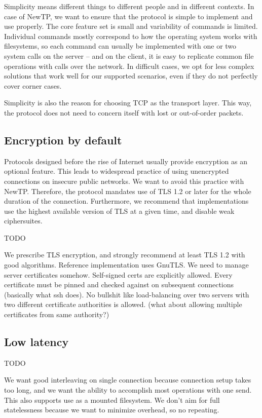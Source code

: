 Simplicity means different things to different people and in different contexts. In case of NewTP, we want to
ensure that the protocol is simple to implement and use properly. The core feature set is small and
variability of commands is limited. Individual commands mostly correspond to how the operating system works
with filesystems, so each command can usually be implemented with one or two system calls on the server -- and
on the client, it is easy to replicate common file operations with calls over the network. In difficult cases,
we opt for less complex solutions that work well for our supported scenarios, even if they do not perfectly
cover corner cases.

Simplicity is also the reason for choosing TCP as the transport layer. This way, the protocol does not need to
concern itself with lost or out-of-order packets.

\subsection{Encryption by default}

Protocols designed before the rise of Internet usually provide encryption as an optional feature. This leads
to widespread practice of using unencrypted connections on insecure public networks. We want to avoid this
practice with NewTP. Therefore, the protocol mandates use of TLS 1.2 or later for the whole duration of the
connection.  Furthermore, we recommend that implementations use the highest available version of TLS at
a given time, and disable weak ciphersuites.

TODO

We prescribe TLS encryption, and strongly recommend at least TLS 1.2 with good algorithms. Reference
implementation uses GnuTLS. We need to manage server certificates somehow. Self-signed certs are explicitly
allowed. Every certificate must be pinned and checked against on subsequent connections (basically what ssh
does). No bullshit like load-balancing over two servers with two different certificate authorities is allowed.
(what about allowing multiple certificates from same authority?)

\subsection{Low latency}

TODO

We want good interleaving on single connection because connection setup takes too long, and we want the
ability to accomplish most operations with one send. This also supports use as a mounted filesystem. We don't
aim for full statelessness because we want to minimize overhead, so no repeating.

